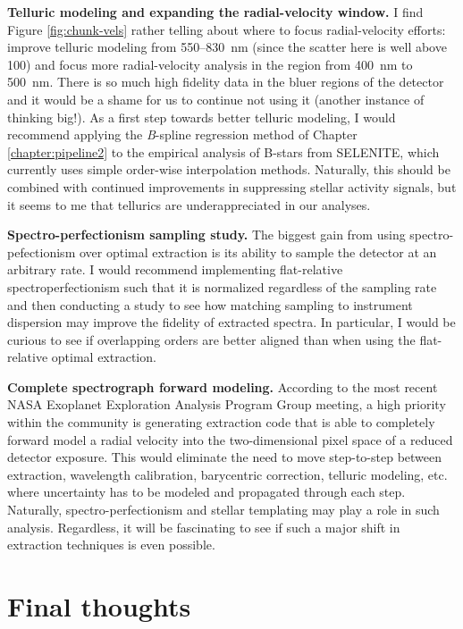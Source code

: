 \textbf{Telluric modeling and expanding the radial-velocity window.} I find Figure \ref{fig:chunk-vels} rather telling about where to focus radial-velocity efforts: improve telluric modeling from 550--830~\si{\nano\meter} (since the scatter here is well above 100\ms) and focus more radial-velocity analysis in the region from 400~\si{\nano\meter} to 500~\si{\nano\meter}. There is so much high fidelity data in the bluer regions of the detector and it would be a shame for us to continue not using it (another instance of thinking big!). As a first step towards better telluric modeling, I would recommend applying the \textit{B}-spline regression method of Chapter \ref{chapter:pipeline2} to the empirical analysis of B-stars from SELENITE, which currently uses simple order-wise interpolation methods. Naturally, this should be combined with continued improvements in suppressing stellar activity signals, but it seems to me that tellurics are underappreciated in our analyses.

\textbf{Spectro-perfectionism sampling study.} The biggest gain from using spectro-pefectionism over optimal extraction is its ability to sample the detector at an arbitrary rate. I would recommend implementing flat-relative spectroperfectionism such that it is normalized regardless of the sampling rate and then conducting a study to see how matching sampling to instrument dispersion may improve the fidelity of extracted spectra. In particular, I would be curious to see if overlapping orders are better aligned than when using the flat-relative optimal extraction.

\textbf{Complete spectrograph forward modeling.} According to the most recent NASA Exoplanet Exploration Analysis Program Group meeting, a high priority within the community is generating extraction code that is able to completely forward model a radial velocity into the two-dimensional pixel space of a reduced detector exposure. This would eliminate the need to move step-to-step between extraction, wavelength calibration, barycentric correction, telluric modeling, etc. where uncertainty has to be modeled and propagated through each step. Naturally, spectro-perfectionism and stellar templating may play a role in such analysis. Regardless, it will be fascinating to see if such a major shift in extraction techniques is even possible.

\section{Final thoughts} \label{conclusion:final}

